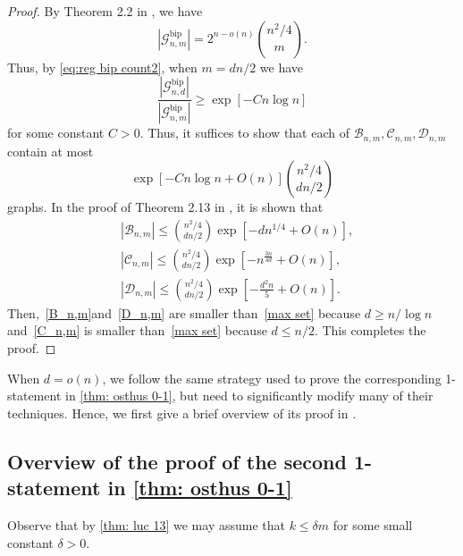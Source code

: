 \documentclass[11pt]{article}
\theoremstyle{plain}
\begin{document}
\begin{proof}
    By Theorem 2.2 in \cite{Promel1996Structure}, we have 
    \begin{equation}\label{eq: num bip graphs}
        |\mathcal G_{n,m}^\text{bip}| = 2^{n - o(n)}\binom{n^2/4}{m}.
    \end{equation}
    Thus, by \eqref{eq:reg bip count2}, when $m = dn/2$ we have 
    \begin{equation}
        \frac{|\mathcal G_{n,d}^\text{bip}|}{|\mathcal G_{n,m}^\text{bip}|} \geq \exp[-Cn\log n]
    \end{equation}
    for some constant $C > 0$. Thus, it suffices to show that each of $\mathcal B_{n,m},\mathcal C_{n,m},\mathcal D_{n,m}$ contain at most 
    \begin{equation}\label{max set}
        \exp[-Cn\log n + O(n)]\binom{n^2/4}{dn/2}
    \end{equation}
    graphs. In the proof of Theorem 2.13 in \cite{Promel1996Structure}, it is shown that 
    \begin{align}
        &|\mathcal B_{n,m}| \leq \binom{n^2/4}{dn/2}\exp\left[-dn^{1/4} + O(n)\right],\label{B_n,m}\\
        &|\mathcal C_{n,m}| \leq \binom{n^2/4}{dn/2} \exp\left[-n^{\frac{3n}{4d}} + O(n)\right],\label{C_n,m}\\
        &|\mathcal D_{n,m}| \leq \binom{n^2/4}{dn/2}\exp\left[ -\frac{d^2n}{5} + O(n) \right].\label{D_n,m}
    \end{align}
    Then,~\eqref{B_n,m}and~\eqref{D_n,m} are smaller than~\eqref{max set} because $d \geq n/\log n$ and~\eqref{C_n,m} is smaller than~\eqref{max set} because $d \leq n/2$. This completes the proof.
    
\end{proof}

When $d = o(n)$, we follow the same strategy used to prove the corresponding 1-statement in \cref{thm: osthus 0-1}, but need to significantly modify many of their techniques. Hence, we first give a brief overview of its proof in \cite{osthus2003densities}. 

\subsection{Overview of the proof of the second 1-statement in \cref{thm: osthus 0-1}}\label{sec: overview}


Observe that by \cref{thm: luc 13} we may assume that $k \le \delta m$ for some small constant $\delta > 0$.
\end{document}
